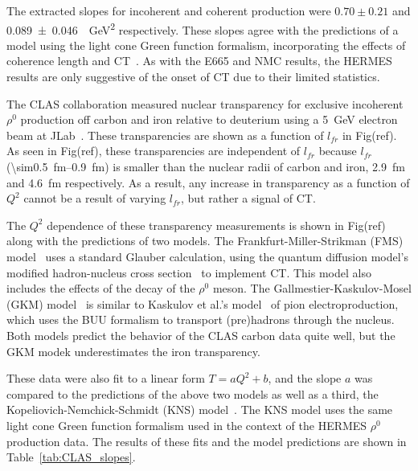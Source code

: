The extracted slopes for incoherent and coherent production were $0.70\pm0.21$
and \SI{0.089\pm0.046}{\per\giga\electronvolt\squared} respectively.
These slopes agree with the predictions of a model using the light cone Green
function formalism, incorporating the effects of coherence length and
CT~\cite{Kopeliovich_2002}.
As with the E665 and NMC results, the HERMES results are only suggestive of the
onset of CT due to their limited statistics.


The CLAS collaboration measured nuclear transparency for exclusive
incoherent $\rho^0$ production off carbon and iron relative to deuterium using
a \SI{5}{\giga\electronvolt} electron beam at JLab~\cite{ElFassi_2012}.
These transparencies are shown as a function of $l_{fr}$ in Fig(ref).
As seen in Fig(ref), these transparencies are independent of $l_{fr}$ because
$l_{fr}$ (\SIrange{\sim0.5}{0.9}{\femto\meter}) is smaller than the nuclear
radii of carbon and iron, \SI{2.9}{\femto\meter} and \SI{4.6}{\femto\meter}
respectively.
As a result, any increase in transparency as a function of $Q^2$ cannot be a
result of varying $l_{fr}$, but rather a signal of CT.


The $Q^2$ dependence of these transparency measurements is shown in Fig(ref)
along with the predictions of two models.
The Frankfurt-Miller-Strikman (FMS) model~\cite{Frankfurt_2008} uses a standard
Glauber calculation, using the quantum diffusion model's modified
hadron-nucleus cross section~\cite{Farrar_1988} to implement CT. This model
also includes the effects of the decay of the $\rho^0$ meson.
The Gallmestier-Kaskulov-Mosel (GKM) model~\cite{Gallmeister_2011} is similar
to Kaskulov et al.'s model~\cite{Kaskulov_2008} of pion electroproduction,
which uses the BUU formalism to transport (pre)hadrons through the nucleus.
Both models predict the behavior of the CLAS carbon data quite well, but the
GKM modek underestimates the iron transparency.


These data were also fit to a linear form $T=aQ^2+b$,
and the slope $a$ was compared to the predictions of the above two models as
well as a third, the Kopeliovich-Nemchick-Schmidt (KNS)
model~\cite{Kopeliovich_2007}.
The KNS model uses the same light cone Green function formalism used in the
context of the HERMES $\rho^0$ production data.
The results of these fits and the model predictions are shown in
Table~\ref{tab:CLAS_slopes}.

